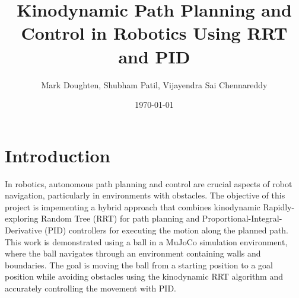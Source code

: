 \documentclass[12pt]{article}
\title{Kinodynamic Path Planning and Control in Robotics Using RRT and PID}
\author{Mark Doughten, Shubham Patil, Vijayendra Sai Chennareddy}
\date{\today}
\begin{document}
\maketitle

\section{Introduction}
In robotics, autonomous path planning and control are crucial aspects of robot navigation, particularly in environments with obstacles. The objective of this project is impementing a hybrid approach that combines kinodynamic Rapidly-exploring Random Tree (RRT) for path planning and Proportional-Integral-Derivative (PID) controllers for executing the motion along the planned path. This work is demonstrated using a ball in a MuJoCo simulation environment, where the ball navigates through an environment containing walls and boundaries. The goal is moving the ball from a starting position to a goal position while avoiding obstacles using the kinodynamic RRT algorithm and accurately controlling the movement with PID.
\end{document}
